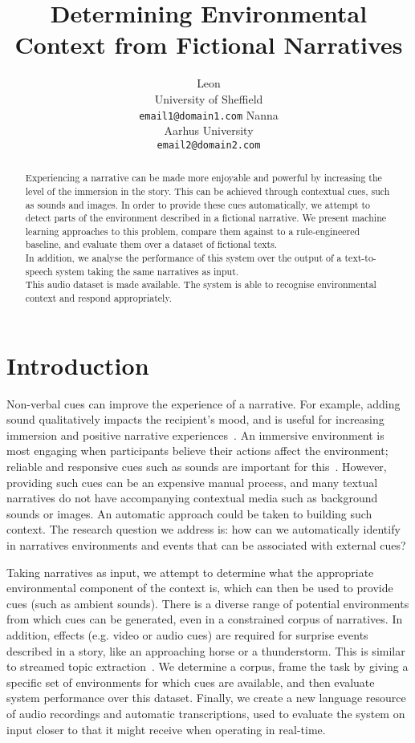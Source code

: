\documentclass[11pt]{article}
\title{Determining Environmental Context from Fictional Narratives}
\author{Leon\\
  University of Sheffield\\
  {\tt email1@domain1.com}  \And
  Nanna\\
  Aarhus University\\
  {\tt  email2@domain2.com}}
\date{}
\begin{document}
\maketitle
\begin{abstract}
Experiencing a narrative can be made more enjoyable and powerful by increasing the level of the immersion in the story.
This can be achieved through contextual cues, such as sounds and images.
In order to provide these cues automatically, we attempt to detect parts of the environment described in a fictional narrative.
We present machine learning approaches to this problem, compare them against to a rule-engineered baseline, and evaluate them over a dataset of fictional texts.
\\In addition, we analyse the performance of this system over the output of a text-to-speech system taking the same narratives as input.
\\This audio dataset is made available.
The system is able to recognise environmental context and respond appropriately.
\end{abstract}


\section{Introduction}

Non-verbal cues can improve the experience of a narrative. 
For example, adding sound qualitatively impacts the recipient's mood, and is useful for increasing immersion and positive narrative experiences~\cite{ermi2005fundamental,madden2009collaborative,huiberts2010captivating}.
An immersive environment is most engaging when participants believe their actions affect the environment; reliable and responsive cues such as sounds are important for this~\cite{bobick1999kidsroom}.
However, providing such cues can be an expensive manual process, and many textual narratives do not have accompanying contextual media such as background sounds or images.
An automatic approach could be taken to building such context.
The research question we address is: how can we automatically identify in narratives environments and events that can be associated with external cues?

Taking narratives as input, we attempt to determine what the appropriate environmental component of the context is, which can then be used to provide cues (such as ambient sounds).
There is a diverse range of potential environments from which cues can be generated, even in a constrained corpus of narratives.
In addition, effects (e.g. video or audio cues) are required for surprise events described in a story, like an approaching horse or a thunderstorm.
This is similar to streamed topic extraction~\cite{allan2002introduction,preotiuc2012trendminer}.
We determine a corpus, frame the task by giving a specific set of environments for which cues are available, and then evaluate system performance over this dataset.
Finally, we create a new language resource of audio recordings and automatic transcriptions, used to evaluate the system on input closer to that it might receive when operating in real-time.
\end{document}
